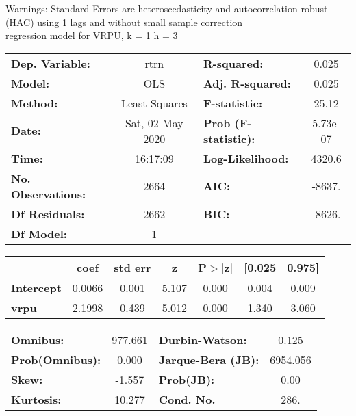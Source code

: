 Warnings: \newline
 [1] Standard Errors are heteroscedasticity and autocorrelation robust (HAC) using 1 lags and without small sample correction\\ 

regression model for VRPU, k = 1 h = 3\begin{center}
\begin{tabular}{lclc}
\toprule
\textbf{Dep. Variable:}    &       rtrn       & \textbf{  R-squared:         } &     0.025   \\
\textbf{Model:}            &       OLS        & \textbf{  Adj. R-squared:    } &     0.025   \\
\textbf{Method:}           &  Least Squares   & \textbf{  F-statistic:       } &     25.12   \\
\textbf{Date:}             & Sat, 02 May 2020 & \textbf{  Prob (F-statistic):} &  5.73e-07   \\
\textbf{Time:}             &     16:17:09     & \textbf{  Log-Likelihood:    } &    4320.6   \\
\textbf{No. Observations:} &        2664      & \textbf{  AIC:               } &    -8637.   \\
\textbf{Df Residuals:}     &        2662      & \textbf{  BIC:               } &    -8626.   \\
\textbf{Df Model:}         &           1      & \textbf{                     } &             \\
\bottomrule
\end{tabular}
\begin{tabular}{lcccccc}
                   & \textbf{coef} & \textbf{std err} & \textbf{z} & \textbf{P$> |$z$|$} & \textbf{[0.025} & \textbf{0.975]}  \\
\midrule
\textbf{Intercept} &       0.0066  &        0.001     &     5.107  &         0.000        &        0.004    &        0.009     \\
\textbf{vrpu}      &       2.1998  &        0.439     &     5.012  &         0.000        &        1.340    &        3.060     \\
\bottomrule
\end{tabular}
\begin{tabular}{lclc}
\textbf{Omnibus:}       & 977.661 & \textbf{  Durbin-Watson:     } &    0.125  \\
\textbf{Prob(Omnibus):} &   0.000 & \textbf{  Jarque-Bera (JB):  } & 6954.056  \\
\textbf{Skew:}          &  -1.557 & \textbf{  Prob(JB):          } &     0.00  \\
\textbf{Kurtosis:}      &  10.277 & \textbf{  Cond. No.          } &     286.  \\
\bottomrule
\end{tabular}
\end{center}

